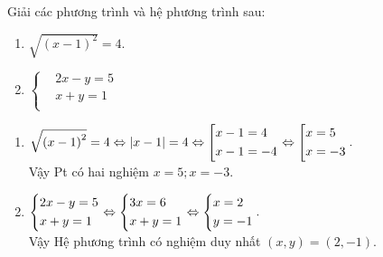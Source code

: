\begin{ex}%
    Giải các phương trình và hệ phương trình sau: 
    \begin{enumerate}
    	\item $\sqrt{( x-1)^2}=4.$
    	\item $\left\{ \begin{aligned}
    			& 2x-y=5 \\ 
    			& x+y=1 \\ 
    		\end{aligned} \right.$     	
    \end{enumerate}
\loigiai
    {
    	\begin{enumerate}
    		\item $\sqrt{{\left(x-1\right)}^2}=4\Leftrightarrow \left| x-1\right|=4 
    		\Leftrightarrow
    		 \left[\begin{aligned}
    			& x-1=4 \\ 
    			& x-1=-4 \\ 
    		\end{aligned}\right.\Leftrightarrow 
    		\left[\begin{aligned}
    			& x=5 \\ 
    			& x=-3 \\ 
    		\end{aligned}\right..$\\
    		Vậy Pt có hai nghiệm $x = 5; x=-3. $
    		\item $\left\{\begin{aligned}
    			& 2x-y=5 \\ 
    			& x+y=1 \\ 
    		\end{aligned}\right.\Leftrightarrow \left\{\begin{aligned}
    			& 3x=6 \\ 
    			& x+y=1 \\ 
    		\end{aligned}\right.\Leftrightarrow \left\{\begin{aligned}
    			& x=2 \\ 
    			& y=-1 \\ 
    		\end{aligned}\right..$\\
    		Vậy Hệ phương trình có nghiệm duy nhất $(x, y) = (2,-1).$
    		
    		
    	\end{enumerate}
    
    }
\end{ex}


